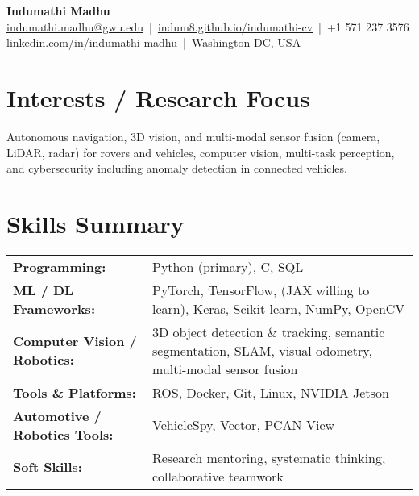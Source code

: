 \documentclass[a4paper,11pt]{article}
\begin{document}
\pagestyle{empty}  %

\begin{center}
    {\LARGE \textbf{Indumathi Madhu}} \\
    \vspace{2pt}
    \href{mailto:indumathi.madhu@gwu.edu}{indumathi.madhu@gwu.edu} \,|\, 
    \href{https://indum8.github.io/indumathi-cv/}{indum8.github.io/indumathi-cv} \,|\, 
    +1 571 237 3576 \\
    \href{https://www.linkedin.com/in/indumathi-madhu/}{linkedin.com/in/indumathi-madhu} \,|\, 
    Washington DC, USA
\end{center}

\vspace{4pt}

\section*{Interests / Research Focus}
Autonomous navigation, 3D vision, and multi-modal sensor fusion (camera, LiDAR, radar) for rovers and vehicles, computer vision, multi-task perception, and cybersecurity including anomaly detection in connected vehicles.

\section*{Skills Summary}
\begin{tabular}{@{} l p{12cm} @{}}
\textbf{Programming:} & Python (primary), C, SQL \\
\textbf{ML / DL Frameworks:} & PyTorch, TensorFlow, (JAX willing to learn), Keras, Scikit-learn, NumPy, OpenCV \\
\textbf{Computer Vision / Robotics:} & 3D object detection \& tracking, semantic segmentation, SLAM, visual odometry, multi-modal sensor fusion \\
\textbf{Tools \& Platforms:} & ROS, Docker, Git, Linux, NVIDIA Jetson \\
\textbf{Automotive / Robotics Tools:} & VehicleSpy, Vector, PCAN View \\
\textbf{Soft Skills:} & Research mentoring, systematic thinking, collaborative teamwork
\end{tabular}
\end{document}
